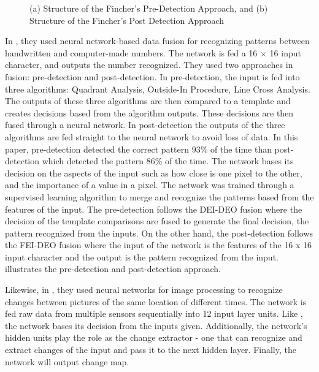 \begin{figure}[h]
	\centering
	\captionsetup{justification=centering}
	\caption{(a) Structure of the Fincher’s Pre-Detection Approach, and (b) Structure of the Fincher’s Post Detection Approach}
	\label{fig:fincher_approach}
\end{figure}

In , they used neural network-based data fusion for recognizing patterns between handwritten and computer-made numbers. The network is fed a 16 $\times$ 16 input character, and outputs the number recognized. They used two approaches in fusion: pre-detection and post-detection. In pre-detection, the input is fed into three algorithms: Quadrant Analysis, Outside-In Procedure, Line Cross Analysis. The outputs of these three algorithms are then compared to a template and creates decisions based from the algorithm outputs. These decisions are then fused through a neural network. In post-detection the outputs of the three algorithms are fed straight to the neural network to avoid loss of data. In this paper, pre-detection detected the correct pattern 93\% of the time than post-detection which detected the pattern 86\% of the time. The network bases its decision on the aspects of the input such as how close is one pixel to the other, and the importance of a value in a pixel. The network was trained through a supervised learning algorithm to merge and recognize the patterns based from the features of the input. The pre-detection follows the DEI-DEO fusion where the decision of the template comparisons are fused to generate the final decision, the pattern recognized from the inputs. On the other hand, the post-detection follows the FEI-DEO fusion where the input of the network is the features of the 16 x 16 input character and the output is the pattern recognized from the input.  illustrates the pre-detection and post-detection approach.

Likewise, in , they used neural networks for image processing to recognize changes between pictures of the same location of different times. The network is fed raw data from multiple sensors sequentially into 12 input layer units. Like , the network bases its decision from the inputs given. Additionally, the network’s hidden units play the role as the change extractor - one that can recognize and extract changes of the input and pass it to the next hidden layer. Finally, the network will output change map. 

